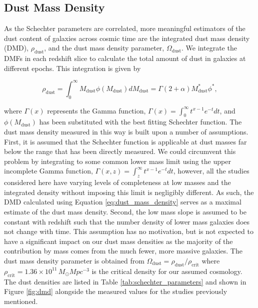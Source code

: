 \subsection{Dust Mass Density}

As the Schechter parameters are correlated, more meaningful estimators of the dust content of galaxies across cosmic time are the integrated dust mass density (DMD), $\rho_{\textrm{dust}}$, and the dust mass density parameter, $\Omega_{\textrm{dust}}$. We integrate the DMFs in each redshift slice to calculate the total amount of dust in galaxies at different epochs. This integration is given by

\begin{equation}
    \rho_{\textrm{dust}} = \int_0^\infty M_{\textrm{dust}} \phi(M_{\textrm{dust}}) dM_{\textrm{dust}} = \Gamma(2+\alpha) M_{\textrm{dust}}^* \phi^*,
    \label{eq:dust_mass_density}
\end{equation}

\noindent where $\Gamma(x)$ represents the Gamma function, $\Gamma(x) = \int_0^\infty t^{x-1}e^{-t} dt$, and $\phi(M_{\textrm{dust}})$ has been substituted with the best fitting Schechter function. The dust mass density measured in this way is built upon a number of assumptions. First, it is assumed that the Schechter function is applicable at dust masses far below the range that has been directly measured. We could circumvent this problem by integrating to some common lower mass limit using the upper incomplete Gamma function, $\Gamma(x, z) = \int_z^\infty t^{x-1}e^{-t} dt$, however, all the studies considered here have varying levels of completeness at low masses and the integrated density without imposing this limit is negligibly different. As such, the DMD calculated using Equation \ref{eq:dust_mass_density} serves as a maximal estimate of the dust mass density. Second, the low mass slope is assumed to be constant with redshift such that the number density of lower mass galaxies does not change with time. This assumption has no motivation, but is not expected to have a significant impact on our dust mass densities as the majority of the contribution by mass comes from the much fewer, more massive galaxies. The dust mass density parameter is obtained from $\Omega_{\textrm{dust}} = \rho_{\textrm{dust}}/\rho_{\textrm{crit}}$ where $\rho_{\textrm{crit}} = 1.36\times10^{11}\,M_{\odot}Mpc^{-3}$ is the critical density for our assumed cosmology. The dust densities are listed in Table \ref{tab:schechter_parameters} and shown in Figure \ref{fig:dmd} alongside the measured values for the studies previously mentioned. 


